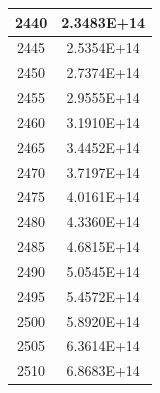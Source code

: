 \documentclass[a4paper]{article}
\begin{document}
\begin{tabular}{| c | c |}
    	2440 & 2.3483E+14 \\\hline
    	2445 & 2.5354E+14 \\\hline
    	2450 & 2.7374E+14 \\\hline
    	2455 & 2.9555E+14 \\\hline
    	2460 & 3.1910E+14 \\\hline
    	2465 & 3.4452E+14 \\\hline
    	2470 & 3.7197E+14 \\\hline
    	2475 & 4.0161E+14 \\\hline
    	2480 & 4.3360E+14 \\\hline
    	2485 & 4.6815E+14 \\\hline
    	2490 & 5.0545E+14 \\\hline
    	2495 & 5.4572E+14 \\\hline
    	2500 & 5.8920E+14 \\\hline
    	2505 & 6.3614E+14 \\\hline
    	2510 & 6.8683E+14 \\\hline
    \end{tabular}
    \hfill
\end{document}
